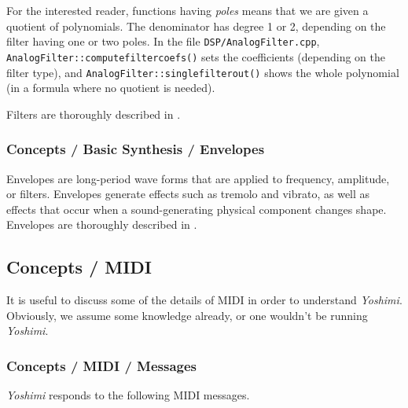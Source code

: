    For the interested reader, functions having \textsl{poles}
   means that we are given a quotient of polynomials. The denominator has
   degree 1 or 2, depending on the filter having one or two poles. In the
   file \texttt{DSP/AnalogFilter.cpp},
   \texttt{AnalogFilter::computefiltercoefs()} sets the coefficients
   (depending on the filter type), and
   \texttt{AnalogFilter::singlefilterout()} shows the whole polynomial (in a
   formula where no quotient is needed).

   Filters are thoroughly described in
   .

\subsubsection{Concepts / Basic Synthesis / Envelopes}
\label{subsubsec:concepts_basics_envelopes}

   Envelopes are long-period wave forms that are applied to frequency,
   amplitude, or filters.  Envelopes generate effects such as tremolo and
   vibrato, as well as effects that occur when a sound-generating physical
   component changes shape.
   Envelopes are thoroughly described in
   .

\subsection{Concepts / MIDI}
\label{subsec:concepts_midi}

   It is useful to discuss some of the details of MIDI in order
   to understand \textsl{Yoshimi}.  Obviously, we assume
   some knowledge already, or one wouldn't be running
   \textsl{Yoshimi}.

\subsubsection{Concepts / MIDI / Messages}
\label{subsubsec:concepts_midi_messages}

   \textsl{Yoshimi} responds to the following MIDI messages.

